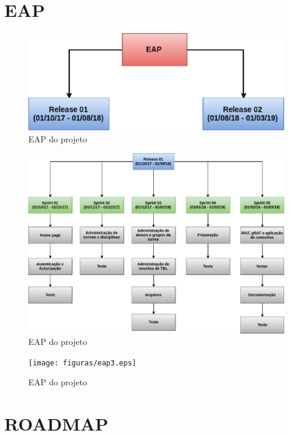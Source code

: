 \begin{apendicesenv}

\partapendices

\chapter{EAP} \label{apendice:eap}

\begin{figure}[h!]
	\centering
  \includegraphics[keepaspectratio=true,scale=0.8]{figuras/eap1.eps}
  \caption{EAP do projeto}
	\label{fig:eap}
\end{figure}

\begin{figure}[h!]
	\centering
  \includegraphics[keepaspectratio=true,scale=0.4]{figuras/eap2.eps}
  \caption{EAP do projeto}
	\label{fig:eap}
\end{figure}

\begin{figure}[h!]
	\centering
  \texttt{[image: figuras/eap3.eps]}
  \caption{EAP do projeto}
	\label{fig:eap}
\end{figure}

\chapter{ROADMAP} \label{apendice:roadmap}


\end{apendicesenv}

